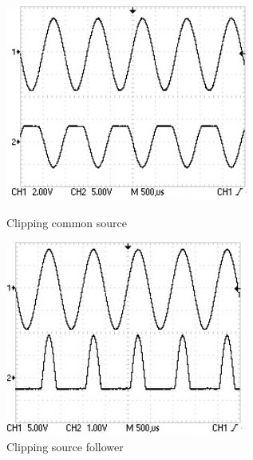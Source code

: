 \documentclass[10pt,a4paper]{article}
\begin{document}
\begin{figure}[h!]
	\centering
	\begin{minipage}{0.49\textwidth}
		\centering
		\includegraphics[width=\textwidth]{../oscilloscopio/clipalto.jpg}
		\caption{Clipping common source}
			\label{fig:clippingalto}
	\end{minipage}
	\begin{minipage}{0.49\textwidth}
		\centering
		\includegraphics[width=\textwidth]{../oscilloscopio/clipbasso.jpg}
		\caption{Clipping source follower}	
			\label{fig:clippingbasso}	
	\end{minipage}
\end{figure}
\end{document}
